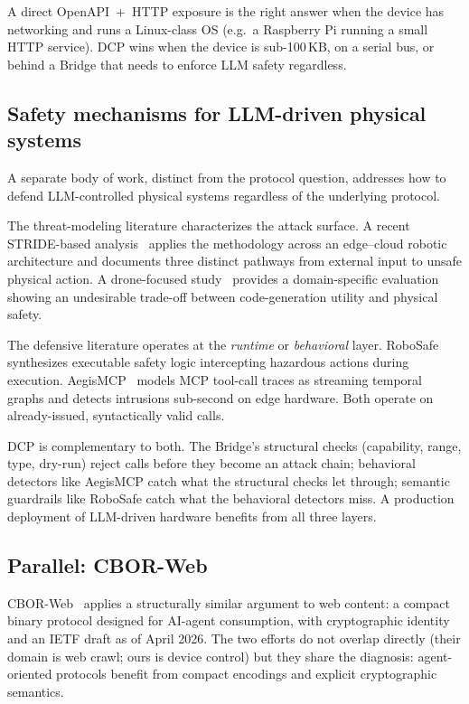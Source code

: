 \documentclass[11pt,a4paper]{article}
\begin{document}
A direct OpenAPI~$+$~HTTP exposure is the right answer when the device has
networking and runs a Linux-class OS (e.g.\ a Raspberry Pi running a small
HTTP service). DCP wins when the device is sub-100\,KB, on a serial bus,
or behind a Bridge that needs to enforce LLM safety regardless.

\subsection{Safety mechanisms for LLM-driven physical systems}

A separate body of work, distinct from the protocol question, addresses
how to defend LLM-controlled physical systems regardless of the underlying
protocol.

The threat-modeling literature characterizes the attack surface. A recent
STRIDE-based analysis~\cite{prompt_to_actuation} applies the methodology
across an edge--cloud robotic architecture and documents three distinct
pathways from external input to unsafe physical action. A drone-focused
study~\cite{physical_safety_llm} provides a domain-specific evaluation
showing an undesirable trade-off between code-generation utility and
physical safety.

The defensive literature operates at the \emph{runtime} or
\emph{behavioral} layer. RoboSafe~\cite{robosafe} synthesizes executable
safety logic intercepting hazardous actions during execution.
AegisMCP~\cite{aegismcp} models MCP tool-call traces as streaming
temporal graphs and detects intrusions sub-second on edge hardware. Both
operate on already-issued, syntactically valid calls.

DCP is complementary to both. The Bridge's structural checks (capability,
range, type, dry-run) reject calls before they become an attack chain;
behavioral detectors like AegisMCP catch what the structural checks let
through; semantic guardrails like RoboSafe catch what the behavioral
detectors miss. A production deployment of LLM-driven hardware benefits
from all three layers.

\subsection{Parallel: CBOR-Web}

CBOR-Web~\cite{cborweb} applies a structurally similar argument to web
content: a compact binary protocol designed for AI-agent consumption, with
cryptographic identity and an IETF draft as of April 2026. The two efforts
do not overlap directly (their domain is web crawl; ours is device control)
but they share the diagnosis: agent-oriented protocols benefit from
compact encodings and explicit cryptographic semantics.
\end{document}
